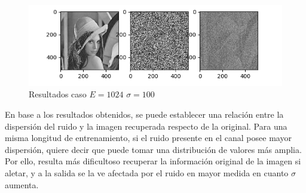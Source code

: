 \begin{figure}[H]
\includegraphics[scale=0.9]{Imagenes/E1024S100}
\centering
\caption{Resultados caso $E=1024$ $\sigma = 100$ }
\end{figure}


En base a los resultados obtenidos, se puede establecer una relaci\'on 
entre la dispersi\'on del ruido y la imagen recuperada respecto de la original. Para una misma longitud de entrenamiento, si el ruido presente en el canal posee mayor dispersi\'on, quiere decir que puede tomar una distribuci\'on de valores m\'as amplia. Por ello, resulta m\'as dificultoso recuperar la informaci\'on original de la imagen si aletar, y a la salida se la ve afectada por el ruido en mayor medida en cuanto $\sigma$ aumenta.

